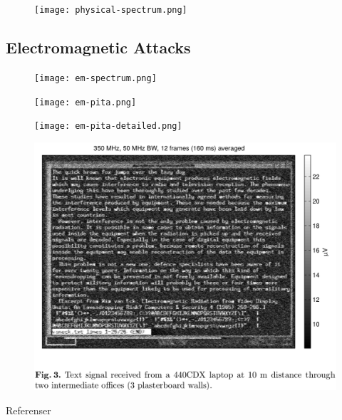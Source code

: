 \begin{frame}
  \begin{figure}
    \texttt{[image: physical-spectrum.png]}
  \end{figure}
\end{frame}

\subsection{Electromagnetic Attacks}

\begin{frame}
  \begin{figure}
    \texttt{[image: em-spectrum.png]}
  \end{figure}
\end{frame}

\begin{frame}
  \begin{figure}
    \texttt{[image: em-pita.png]}
  \end{figure}
\end{frame}

\begin{frame}
  \begin{figure}
    \texttt{[image: em-pita-detailed.png]}
  \end{figure}
\end{frame}

\begin{frame}
  \begin{figure}
    \includegraphics[height=0.9\textheight]{em-laptop.png}
  \end{figure}
  \cite{FlatPanelEmissions}
\end{frame}




\begin{frame}{Referenser}
  \small
  \printbibliography{}
\end{frame}

